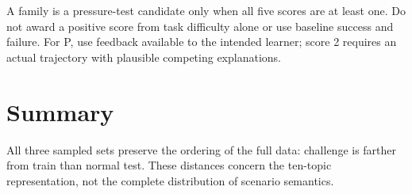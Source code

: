 \documentclass[11pt]{article}
\begin{document}
A family is a pressure-test candidate only when all five scores are at least
one. Do not award a positive score from task difficulty alone or use baseline
success and failure. For P, use feedback available to the intended learner;
score 2 requires an actual trajectory with plausible competing explanations.

\clearpage
\section{Summary}

\begin{table}[htbp]
\centering
\small
\setlength{\tabcolsep}{5pt}
\caption{Full splits, quick2h and conditioned five-scenario-per-split samples,
and the one-third intermediate sample. Topic TV compares each row to its own
full source split; it is zero for the full splits by definition. The two
rightmost columns compare train and test topic distributions \emph{within the
same set}; each value is shown once per three-row set.}
\label{tab:summary}
\end{table}

All three sampled sets preserve the ordering of the full data: challenge is farther
from train than normal test. These distances concern the ten-topic
representation, not the complete distribution of scenario semantics.
\end{document}
